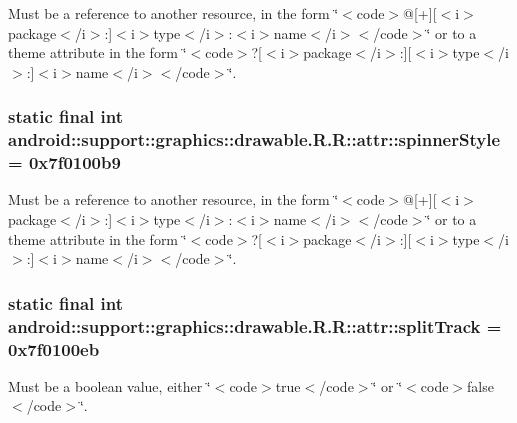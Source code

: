 Must be a reference to another resource, in the form \char`\"{}$<$code$>$@\mbox{[}+\mbox{]}\mbox{[}$<$i$>$package$<$/i$>$:\mbox{]}$<$i$>$type$<$/i$>$:$<$i$>$name$<$/i$>$$<$/code$>$\char`\"{} or to a theme attribute in the form \char`\"{}$<$code$>$?\mbox{[}$<$i$>$package$<$/i$>$:\mbox{]}\mbox{[}$<$i$>$type$<$/i$>$:\mbox{]}$<$i$>$name$<$/i$>$$<$/code$>$\char`\"{}. \hypertarget{classandroid_1_1support_1_1graphics_1_1drawable_1_1_r_1_1attr_fb9cf0ad45aec7e5c8044d19af4856db}{
\subsubsection[{spinnerStyle}]{\setlength{\rightskip}{0pt plus 5cm}static final int android::support::graphics::drawable.R.R::attr::spinnerStyle = 0x7f0100b9}}
\label{classandroid_1_1support_1_1graphics_1_1drawable_1_1_r_1_1attr_fb9cf0ad45aec7e5c8044d19af4856db}


Must be a reference to another resource, in the form \char`\"{}$<$code$>$@\mbox{[}+\mbox{]}\mbox{[}$<$i$>$package$<$/i$>$:\mbox{]}$<$i$>$type$<$/i$>$:$<$i$>$name$<$/i$>$$<$/code$>$\char`\"{} or to a theme attribute in the form \char`\"{}$<$code$>$?\mbox{[}$<$i$>$package$<$/i$>$:\mbox{]}\mbox{[}$<$i$>$type$<$/i$>$:\mbox{]}$<$i$>$name$<$/i$>$$<$/code$>$\char`\"{}. \hypertarget{classandroid_1_1support_1_1graphics_1_1drawable_1_1_r_1_1attr_b7c451456ce8886338304e55d42a58a8}{
\subsubsection[{splitTrack}]{\setlength{\rightskip}{0pt plus 5cm}static final int android::support::graphics::drawable.R.R::attr::splitTrack = 0x7f0100eb}}
\label{classandroid_1_1support_1_1graphics_1_1drawable_1_1_r_1_1attr_b7c451456ce8886338304e55d42a58a8}


Must be a boolean value, either \char`\"{}$<$code$>$true$<$/code$>$\char`\"{} or \char`\"{}$<$code$>$false$<$/code$>$\char`\"{}. 

